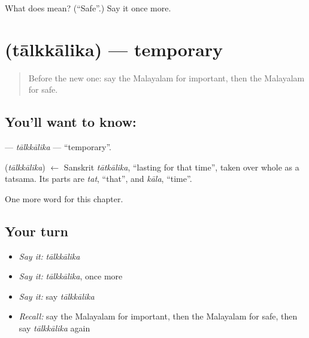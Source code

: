 \begin{tcolorbox}[breakable,colback=teal!4,colframe=teal!35!black,title={Before you move on}]
What does  mean? (\textquotedblleft{}Safe\textquotedblright{}.) Say it once more.
\end{tcolorbox}
\section[\texorpdfstring{\ml{താൽക്കാലിക} (tālkkālika)}{താൽക്കാലിക (tālkkālika)}]{ (tālkkālika) — temporary}

\label{lesson:ML-C283-talkkalika}



\begin{quote}
Before the new one: say the Malayalam for important, then the Malayalam for safe.
\end{quote}

\subsection*{You'll want to know: }
\textbf{} — \emph{tālkkālika} — \textquotedblleft{}temporary\textquotedblright{}.

\begin{cousinweb}
\textbf{} (\emph{tālkkālika}) $\leftarrow$ Sanskrit \emph{tātkālika}, \textquotedblleft{}lasting for that time\textquotedblright{}, taken over whole as a tatsama. Its parts are \emph{tat}, \textquotedblleft{}that\textquotedblright{}, and \emph{kāla}, \textquotedblleft{}time\textquotedblright{}.
\end{cousinweb}

\begin{grammarlens}[title={What you've built}]
One more word for this chapter.
\end{grammarlens}

\subsection*{Your turn}
\begin{itemize}
\raggedright
  \item \emph{Say it:} \emph{tālkkālika}
  \item \emph{Say it:} \emph{tālkkālika}, once more
  \item \emph{Say it:} say \emph{tālkkālika}
  \item \emph{Recall:} say the Malayalam for important, then the Malayalam for safe, then say \emph{tālkkālika} again
\end{itemize}

